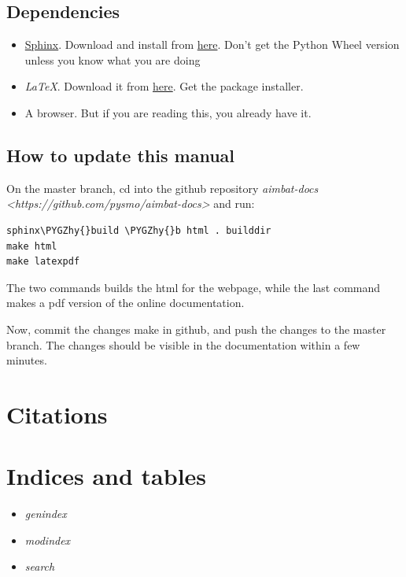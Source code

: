 \documentclass[letterpaper,10pt,english]{sphinxmanual}
\def\PYGZhy{\char`\-}
\begin{document}
\section{Dependencies}
\label{docfiles/updatingThisManual:dependencies}\begin{itemize}
\item {} 
\href{http://sphinx-doc.org/}{Sphinx}. Download and install from \href{https://pypi.python.org/pypi/Sphinx}{here}. Don't get the Python Wheel version unless you know what you are doing

\item {} 
\emph{LaTeX}. Download it from \href{http://www.tug.org/mactex/}{here}. Get the package installer.

\item {} 
A browser. But if you are reading this, you already have it.

\end{itemize}


\section{How to update this manual}
\label{docfiles/updatingThisManual:how-to-update-this-manual}
On the master branch, cd into the github repository \emph{aimbat-docs \textless{}https://github.com/pysmo/aimbat-docs\textgreater{}} and run:

\begin{Verbatim}[commandchars=\\\{\}]
sphinx\PYGZhy{}build \PYGZhy{}b html . builddir
make html
make latexpdf
\end{Verbatim}

The two commands builds the html for the webpage, while the last command makes a pdf version of the online documentation.

Now, commit the changes make in github, and push the changes to the master branch. The changes should be visible in the documentation within a few minutes.


\chapter{Citations}
\label{docfiles/citations:citations}\label{docfiles/citations::doc}

\chapter{Indices and tables}
\label{index:indices-and-tables}\begin{itemize}
\item {} 
\emph{genindex}

\item {} 
\emph{modindex}

\item {} 
\emph{search}

\end{itemize}
\end{document}
